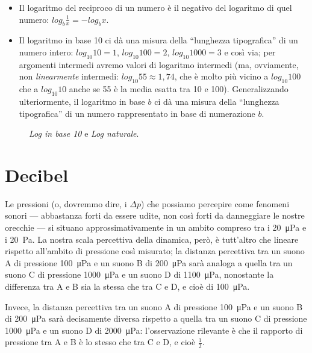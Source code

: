 \begin{itemize}
\item Il logaritmo del reciproco di un numero è il negativo del logaritmo di quel numero: $log _b \frac{1}{x} = -log _b x$.

\item Il logaritmo in base 10 ci dà una misura della ``lunghezza tipografica'' di un numero intero: $log_{10}10 = 1$, $log_{10}100 = 2$, $log_{10}1000 = 3$ e così via; per argomenti intermedi avremo valori di logaritmo intermedi (ma, ovviamente, non \emph{linearmente} intermedi: $log_{10}55 \approx 1,74$, che è molto più vicino a $log_{10}100$ che a $log_{10}10$ anche se 55 è la media esatta tra 10 e 100). Generalizzando ulteriormente, il logaritmo in base $b$ ci dà una misura della ``lunghezza tipografica'' di un numero rappresentato in base di numerazione $b$.

\end{itemize}

\begin{figure}
    \begin{center}
       \scalebox{0.6} {}
    \end{center}
    \caption{\emph{Log in base 10} e \emph{Log naturale}.}
\end{figure}


\section{Decibel}

Le pressioni (o, dovremmo dire, i $\Delta p$) che possiamo percepire come fenomeni sonori --- abbastanza forti da essere udite, non così forti da danneggiare le nostre orecchie --- si situano approssimativamente in un ambito compreso tra i \qty{20}{\micro\pascal} e i \qty{20}{\Pa}. La nostra scala percettiva della dinamica, però, è tutt'altro che lineare rispetto all'ambito di pressione così misurato; la distanza percettiva tra un suono A di pressione \qty{100}{\micro\pascal} e un suono B di \qty{200}{\micro\pascal} sarà analoga a quella tra un suono C di pressione \qty{1000}{\micro\pascal} e un suono D di \qty{1100}{\micro\pascal}, nonostante la differenza tra A e B sia la stessa che tra C e D, e cioè di \qty{100}{\micro\pascal}.

Invece, la distanza percettiva tra un suono A di pressione \qty{100}{\micro\pascal} e un suono B di \qty{200}{\micro\pascal} sarà decisamente diversa rispetto a quella tra un suono C di pressione \qty{1000}{\micro\pascal} e un suono D di \qty{2000}{\micro\pascal}: l'osservazione rilevante è che il rapporto di pressione tra A e B è lo stesso che tra C e D, e cioè $\frac{1}{2}$. 

